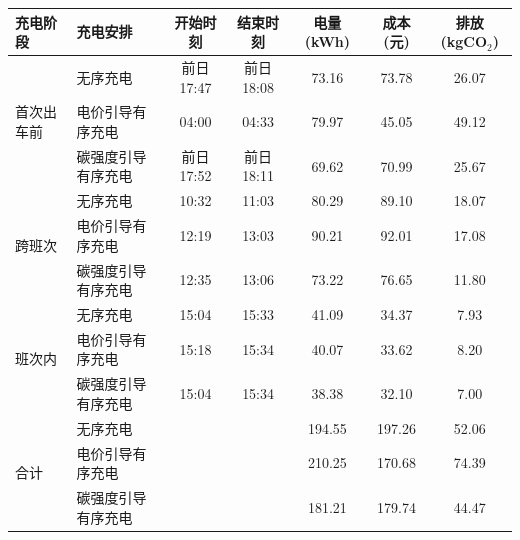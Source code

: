   \begin{tabular*}{\textwidth}{@{\extracolsep{\fill}}llccccc@{}}
    \toprule
    充电阶段 & 充电安排 & 开始时刻 & 结束时刻 & 电量(kWh) & 成本(元) & 排放(kgCO$_2$)\\
    \midrule
    \multirow{3}{*}{首次出车前} & 无序充电 & 前日17:47 & 前日18:08 & 73.16 & 73.78 & 26.07\\
     & 电价引导有序充电 & 04:00 & 04:33 & 79.97 & 45.05 & 49.12\\
     & 碳强度引导有序充电 & 前日17:52 & 前日18:11 & 69.62 & 70.99 & 25.67\\
    \midrule
    \multirow{3}{*}{跨班次} & 无序充电 & 10:32 & 11:03 & 80.29 & 89.10 & 18.07\\
     & 电价引导有序充电 & 12:19 & 13:03 & 90.21 & 92.01 & 17.08\\
     & 碳强度引导有序充电 & 12:35 & 13:06 & 73.22 & 76.65 & 11.80\\
    \midrule
    \multirow{3}{*}{班次内} & 无序充电 & 15:04 & 15:33 & 41.09 & 34.37 & 7.93\\
     & 电价引导有序充电 & 15:18 & 15:34 & 40.07 & 33.62 & 8.20\\
     & 碳强度引导有序充电 & 15:04 & 15:34 & 38.38 & 32.10 & 7.00\\
    \midrule
    \multirow{3}{*}{合计} & 无序充电 &  &  & 194.55 & 197.26 & 52.06\\
     & 电价引导有序充电 &  &  & 210.25 & 170.68 & 74.39\\
     & 碳强度引导有序充电 &  &  & 181.21 & 179.74 & 44.47\\
    \bottomrule
  \end{tabular*}
